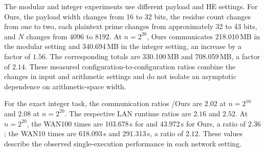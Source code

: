 The modular and integer experiments use different payload and HE
settings. For Ours, the payload width changes from 16 to 32 bits,
the residue count changes from one to two, each plaintext prime changes
from approximately 32 to 43 bits, and $N$ changes from 4096 to 8192.
At $n=2^{20}$, Ours communicates 218.010\,MB in the modular setting
and 340.694\,MB in the integer setting, an increase by a factor of
$1.56$. The corresponding \cite{KLS26} totals are 330.100\,MB and
708.059\,MB, a factor of $2.14$. These measured configuration-to-configuration
ratios combine the changes in input and arithmetic settings and do not
isolate an asymptotic dependence on arithmetic-space width.

For the exact integer task, the communication ratios
\cite{KLS26}/Ours are $2.02$ at $n=2^{16}$ and $2.08$ at
$n=2^{20}$. The respective LAN runtime ratios are $2.16$ and $2.52$.
At $n=2^{20}$, the WAN100 times are 103.678\,s for \cite{KLS26}
and 43.972\,s for Ours, a ratio of $2.36$; the WAN10 times are
618.093\,s and 291.313\,s, a ratio of $2.12$. These values describe
the observed single-execution performance in each network setting.
